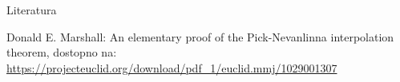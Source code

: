 \documentclass{beamer}
\theoremstyle{definition} %
\theoremstyle{plain} %
\begin{document}
	
	
	
	\begin{frame}{Literatura}
		\begin{thebibliography}{1}
			
			Donald E. Marshall:
			An elementary proof of the Pick-Nevanlinna interpolation theorem, dostopno na:
			\url{https://projecteuclid.org/download/pdf_1/euclid.mmj/1029001307}
			
			
			
		\end{thebibliography}
	\end{frame}
	
	
\end{document}
